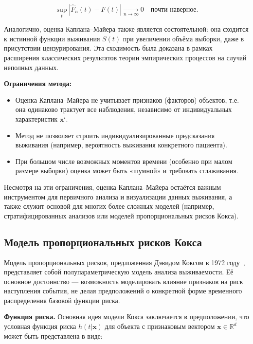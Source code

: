 \documentclass[a4paper,14pt,oneside,openany]{memoir}
\begin{document}
\begin{equation}
	\sup_{t} |\hat{F}_n(t) - F(t)| \xrightarrow[n \to \infty]{} 0 \quad \text{почти наверное}.
\end{equation}

Аналогично, оценка Каплана--Майера также является состоятельной: она сходится к истинной функции выживания $S(t)$ при увеличении объёма выборки, даже в присутствии цензурирования. Эта сходимость была доказана в рамках расширения классических результатов теории эмпирических процессов на случай неполных данных.

\vspace{1em}
\noindent
\textbf{Ограничения метода:}
\begin{itemize}
	\item Оценка Каплана--Майера не учитывает признаков (факторов) объектов, т.е. она одинаково трактует все наблюдения, независимо от индивидуальных характеристик $\mathbf{x}^i$.
	\item Метод не позволяет строить индивидуализированные предсказания выживания (например, вероятность выживания конкретного пациента).
	\item При большом числе возможных моментов времени (особенно при малом размере выборки) оценка может быть «шумной» и требовать сглаживания.
\end{itemize}

Несмотря на эти ограничения, оценка Каплана--Майера остаётся важным инструментом для первичного анализа и визуализации данных выживания, а также служит основой для многих более сложных моделей (например, стратифицированных анализов или моделей пропорциональных рисков Кокса).


\subsection{Модель пропорциональных рисков Кокса}

Модель пропорциональных рисков, предложенная Дэвидом Коксом в 1972 году~\cite{Cox1972}, представляет собой полупараметрическую модель анализа выживаемости. Её основное достоинство — возможность моделировать влияние признаков на риск наступления события, не делая предположений о конкретной форме временного распределения базовой функции риска.

\vspace{1em}
\noindent
\textbf{Функция риска.} Основная идея модели Кокса заключается в предположении, что условная функция риска $h(t|\mathbf{x})$ для объекта с признаковым вектором $\mathbf{x} \in \mathbb{R}^d$ может быть представлена в виде:
\end{document}
